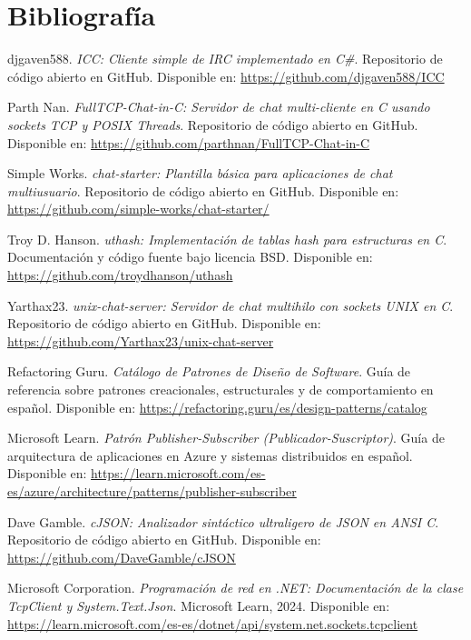 \documentclass[12pt,a4paper]{article}
\begin{document}
\section{Bibliografía}
\begin{enumerate}[label={[\arabic*]}, leftmargin=2em]
    \item djgaven588. \textit{ICC: Cliente simple de IRC implementado en C\#}. Repositorio de código abierto en GitHub. Disponible en: \url{https://github.com/djgaven588/ICC}
    
    \item Parth Nan. \textit{FullTCP-Chat-in-C: Servidor de chat multi-cliente en C usando sockets TCP y POSIX Threads}. Repositorio de código abierto en GitHub. Disponible en: \url{https://github.com/parthnan/FullTCP-Chat-in-C}
    
    \item Simple Works. \textit{chat-starter: Plantilla básica para aplicaciones de chat multiusuario}. Repositorio de código abierto en GitHub. Disponible en: \url{https://github.com/simple-works/chat-starter/}
    
    \item Troy D. Hanson. \textit{uthash: Implementación de tablas hash para estructuras en C}. Documentación y código fuente bajo licencia BSD. Disponible en: \url{https://github.com/troydhanson/uthash}
    
    \item Yarthax23. \textit{unix-chat-server: Servidor de chat multihilo con sockets UNIX en C}. Repositorio de código abierto en GitHub. Disponible en: \url{https://github.com/Yarthax23/unix-chat-server}
    
    \item Refactoring Guru. \textit{Catálogo de Patrones de Diseño de Software}. Guía de referencia sobre patrones creacionales, estructurales y de comportamiento en español. Disponible en: \url{https://refactoring.guru/es/design-patterns/catalog}
    
    \item Microsoft Learn. \textit{Patrón Publisher-Subscriber (Publicador-Suscriptor)}. Guía de arquitectura de aplicaciones en Azure y sistemas distribuidos en español. Disponible en: \url{https://learn.microsoft.com/es-es/azure/architecture/patterns/publisher-subscriber}
    
    \item Dave Gamble. \textit{cJSON: Analizador sintáctico ultraligero de JSON en ANSI C}. Repositorio de código abierto en GitHub. Disponible en: \url{https://github.com/DaveGamble/cJSON}
    
    \item Microsoft Corporation. \textit{Programación de red en .NET: Documentación de la clase TcpClient y System.Text.Json}. Microsoft Learn, 2024. Disponible en: \url{https://learn.microsoft.com/es-es/dotnet/api/system.net.sockets.tcpclient}
\end{enumerate}
\end{document}
